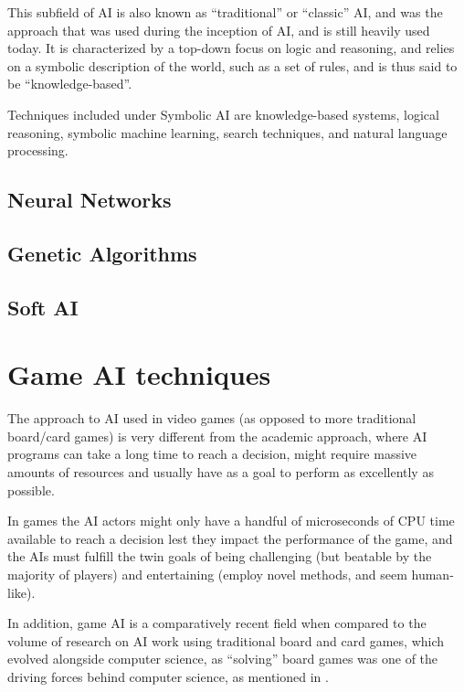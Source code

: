 \documentclass[]{report}
\begin{document}
This subfield of AI is also known as ``traditional'' or ``classic'' AI, and was
the approach that was used during the inception of AI, and is still heavily used
today. It is characterized by a top-down focus on logic and reasoning, and
relies on a symbolic description of the world, such as a set of rules, and is
thus said to be ``knowledge-based''.

Techniques included under Symbolic AI are knowledge-based systems, logical
reasoning, symbolic machine learning, search techniques, and natural language
processing.

\subsection{Neural Networks}
\label{sec:neural-networks}

\subsection{Genetic Algorithms}
\label{sec:genetic-algorithms}

\subsection{Soft AI}
\label{sec:soft-ai}



\section{Game AI techniques}
\label{sec:game-ai-techniques}

The approach to AI used in video games (as opposed to more traditional
board/card games) is very different from the academic approach, where AI
programs can take a long time to reach a decision, might require massive amounts
of resources and usually have as a goal to perform as excellently as possible.

In games the AI actors might only have a handful of microseconds of CPU time
available to reach a decision lest they impact the performance of the game, and
the AIs must fulfill the twin goals of being challenging (but beatable by the
majority of players) and entertaining (employ novel methods, and seem
human-like).

In addition, game AI is a comparatively recent field when compared to the volume
of research on AI work using traditional board and card games, which evolved
alongside computer science, as ``solving'' board games was one of the driving
forces behind computer science, as mentioned in \citet{schaeffer2002games}.
\end{document}
